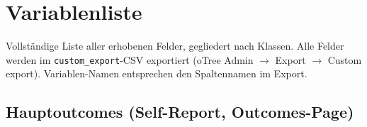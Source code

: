 \documentclass[11pt, a4paper]{scrartcl}
\newcommand{\var}[1]{\texttt{\small #1}}
\begin{document}
\section{Variablenliste}

Vollständige Liste aller erhobenen Felder, gegliedert nach Klassen.
Alle Felder werden im \var{custom\_export}-CSV exportiert (oTree Admin
\(\rightarrow\) Export \(\rightarrow\) Custom export). Variablen-Namen
entsprechen den Spaltennamen im Export.




\subsection{Hauptoutcomes (Self-Report, Outcomes-Page)}
\end{document}
